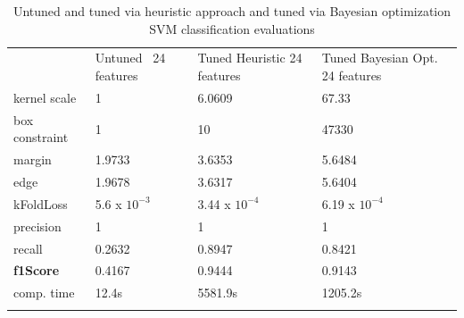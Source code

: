 \begin{table}[h]
	\centering
\caption{Untuned and tuned via heuristic approach and tuned via Bayesian optimization SVM classification evaluations}
\label{tab:contSurfStuckAddedFeat}       %
\begin{tabular}{p{2.6cm}p{2cm}p{2.5cm}p{2.7cm}}
\hline\noalign{\smallskip}
 & Untuned \ 24 features & Tuned Heuristic 24 features & Tuned Bayesian Opt. 24 features\\
\noalign{\smallskip}\hline\noalign{\smallskip}
kernel scale & 1 & 6.0609 & 67.33 \\
box constraint & 1 & 10 &  47330\\
margin & 1.9733 & 3.6353 & 5.6484 \\
edge & 1.9678 & 3.6317 & 5.6404 \\
kFoldLoss & 5.6 x $10^{-3}$ & 3.44 x $10^{-4}$ & 6.19 x $10^{-4}$ \\
precision & 1 & 1 & 1 \\
recall & 0.2632 & 0.8947 & 0.8421\\
\textbf{f1Score} & 0.4167 & 0.9444 & 0.9143 \\
comp. time & 12.4s & 5581.9s &1205.2s \\
\noalign{\smallskip}\hline
\end{tabular}
\end{table}

